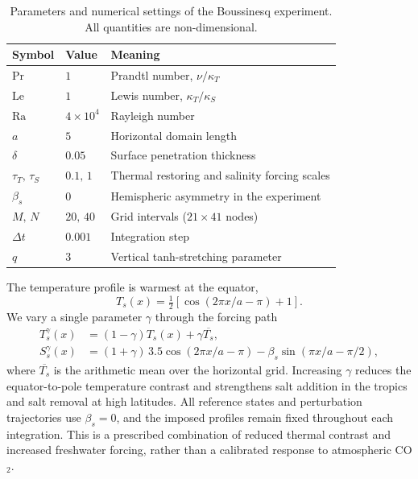 \documentclass[12pt, a4paper]{article}
\newcommand{\CO}{CO\ensuremath{_2}}
\begin{document}
\begin{table}[t]
  \centering
  \caption{Parameters and numerical settings of the Boussinesq experiment. All quantities are non-dimensional.}
  \label{tab:boussinesq-params}
  \begin{tabular}{lll}
    \toprule
    Symbol & Value & Meaning \\
    \midrule
    $\mathrm{Pr}$ & $1$ & Prandtl number, $\nu/\kappa_T$ \\
    $\mathrm{Le}$ & $1$ & Lewis number, $\kappa_T/\kappa_S$ \\
    $\mathrm{Ra}$ & $4\times10^4$ & Rayleigh number \\
    $a$ & $5$ & Horizontal domain length \\
    $\delta$ & $0.05$ & Surface penetration thickness \\
    $\tau_T,\,\tau_S$ & $0.1,\,1$ & Thermal restoring and salinity forcing scales \\
    $\beta_s$ & $0$ & Hemispheric asymmetry in the experiment \\
    $M,\,N$ & $20,\,40$ & Grid intervals ($21\times41$ nodes) \\
    $\Delta t$ & $0.001$ & Integration step \\
    $q$ & $3$ & Vertical tanh-stretching parameter \\
    \bottomrule
  \end{tabular}
\end{table}

The temperature profile is warmest at the equator,
\begin{equation}
  T_s(x)=\tfrac12[\cos(2\pi x/a-\pi)+1].
  \label{eq:Ts}
\end{equation}
We vary a single parameter $\gamma$ through the forcing path
\begin{align}
  T_s^\gamma(x)&=(1-\gamma)T_s(x)+\gamma\overline{T_s}, \label{eq:Tgamma}\\
  S_s^\gamma(x)&=(1+\gamma)\,3.5\cos(2\pi x/a-\pi)
                 -\beta_s\sin(\pi x/a-\pi/2), \label{eq:Sgamma}
\end{align}
where $\overline{T_s}$ is the arithmetic mean over the horizontal grid. Increasing $\gamma$ reduces the equator-to-pole temperature contrast and strengthens salt addition in the tropics and salt removal at high latitudes. All reference states and perturbation trajectories use $\beta_s=0$, and the imposed profiles remain fixed throughout each integration. This is a prescribed combination of reduced thermal contrast and increased freshwater forcing, rather than a calibrated response to atmospheric \CO{}.
\end{document}
